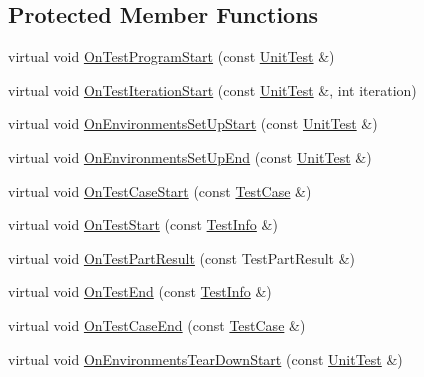 \subsection*{Protected Member Functions}
\begin{DoxyCompactItemize}
\item 
virtual void \mbox{\hyperlink{classtesting_1_1internal_1_1EventRecordingListener_aff89fdd3ae889a54a2ba2f3d4c98d3f6}{On\+Test\+Program\+Start}} (const \mbox{\hyperlink{classtesting_1_1UnitTest}{Unit\+Test}} \&)
\item 
virtual void \mbox{\hyperlink{classtesting_1_1internal_1_1EventRecordingListener_a0bfa276def9594b2a119c2c370f59281}{On\+Test\+Iteration\+Start}} (const \mbox{\hyperlink{classtesting_1_1UnitTest}{Unit\+Test}} \&, int iteration)
\item 
virtual void \mbox{\hyperlink{classtesting_1_1internal_1_1EventRecordingListener_add61e6e7ebffb8afc90ccabcdc9f9982}{On\+Environments\+Set\+Up\+Start}} (const \mbox{\hyperlink{classtesting_1_1UnitTest}{Unit\+Test}} \&)
\item 
virtual void \mbox{\hyperlink{classtesting_1_1internal_1_1EventRecordingListener_a40b4c5e05abd1aa11a030f999f6adb8f}{On\+Environments\+Set\+Up\+End}} (const \mbox{\hyperlink{classtesting_1_1UnitTest}{Unit\+Test}} \&)
\item 
virtual void \mbox{\hyperlink{classtesting_1_1internal_1_1EventRecordingListener_a18c28e1d1c3a1e74e225966456786f8e}{On\+Test\+Case\+Start}} (const \mbox{\hyperlink{classtesting_1_1TestCase}{Test\+Case}} \&)
\item 
virtual void \mbox{\hyperlink{classtesting_1_1internal_1_1EventRecordingListener_aebd488b780fc172d6058ca07ca8f7145}{On\+Test\+Start}} (const \mbox{\hyperlink{classtesting_1_1TestInfo}{Test\+Info}} \&)
\item 
virtual void \mbox{\hyperlink{classtesting_1_1internal_1_1EventRecordingListener_a4a6685d894923f1691ad9c6a4311470e}{On\+Test\+Part\+Result}} (const Test\+Part\+Result \&)
\item 
virtual void \mbox{\hyperlink{classtesting_1_1internal_1_1EventRecordingListener_adb076f145cc20d9b27441b9c75da4b81}{On\+Test\+End}} (const \mbox{\hyperlink{classtesting_1_1TestInfo}{Test\+Info}} \&)
\item 
virtual void \mbox{\hyperlink{classtesting_1_1internal_1_1EventRecordingListener_a4d0cb8a389c7339bce0aa6128291529f}{On\+Test\+Case\+End}} (const \mbox{\hyperlink{classtesting_1_1TestCase}{Test\+Case}} \&)
\item 
virtual void \mbox{\hyperlink{classtesting_1_1internal_1_1EventRecordingListener_a17eebd7bb5cc6bab53b20794919ca5ae}{On\+Environments\+Tear\+Down\+Start}} (const \mbox{\hyperlink{classtesting_1_1UnitTest}{Unit\+Test}} \&)

\end{DoxyCompactItemize}
